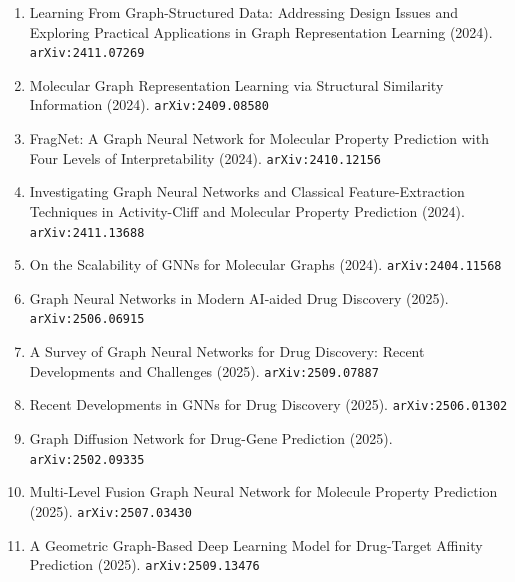 \documentclass[11pt]{article}
\begin{document}
\begin{enumerate}
  \item Learning From Graph-Structured Data: Addressing Design Issues and
  Exploring Practical Applications in Graph Representation Learning (2024). \texttt{arXiv:2411.07269}
  \item Molecular Graph Representation Learning via Structural Similarity
  Information (2024). \texttt{arXiv:2409.08580}
  \item FragNet: A Graph Neural Network for Molecular Property Prediction with Four Levels of Interpretability (2024). \texttt{arXiv:2410.12156}
  \item Investigating Graph Neural Networks and Classical Feature-Extraction
  Techniques in Activity-Cliff and Molecular Property Prediction (2024). \texttt{arXiv:2411.13688}
  \item On the Scalability of GNNs for Molecular Graphs (2024). \texttt{arXiv:2404.11568}
  \item Graph Neural Networks in Modern AI-aided Drug Discovery (2025). \texttt{arXiv:2506.06915}
  \item A Survey of Graph Neural Networks for Drug Discovery: Recent Developments and Challenges (2025). \texttt{arXiv:2509.07887}
  \item Recent Developments in GNNs for Drug Discovery (2025). \texttt{arXiv:2506.01302}
  \item Graph Diffusion Network for Drug-Gene Prediction (2025). \texttt{arXiv:2502.09335}
  \item Multi-Level Fusion Graph Neural Network for Molecule Property Prediction (2025). \texttt{arXiv:2507.03430}
  \item A Geometric Graph-Based Deep Learning Model for Drug-Target Affinity Prediction (2025). \texttt{arXiv:2509.13476}
\end{enumerate}
\end{document}

